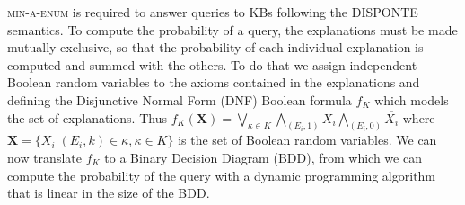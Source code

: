 \textsc{min-a-enum} is required to answer queries to KBs following the DISPONTE semantics. To
compute the probability of a query, the explanations must be made mutually exclusive, so
that the probability of each individual explanation is computed and summed
with the others. To do that we assign independent Boolean random variables to the axioms contained in the explanations and defining 
the Disjunctive Normal Form (DNF) Boolean formula $f_K$ which models the set of explanations. Thus
$
f_K(\mathbf{X})=\bigvee_{\kappa\in K}\bigwedge_{(E_i,1)}X_{i}\bigwedge_{(E_i,0)}\overline{X_{i}}
$
where $\mathbf{X}=\{X_{i}|(E_i,k)\in\kappa,\kappa\in K\}$ is the set of Boolean random variables.
We can now translate $f_K$ to a Binary Decision Diagram (BDD), from which we can compute the probability of the query with a dynamic programming algorithm that is linear in the size of the BDD.
